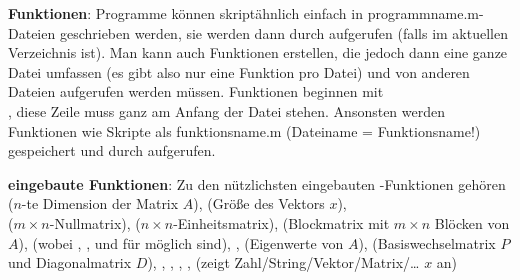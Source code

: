 \textbf{Funktionen}:
Programme können skriptähnlich einfach in programmname.m-Dateien geschrieben
werden, sie werden dann durch  aufgerufen (falls \matlab{} im
aktuellen Verzeichnis ist).
Man kann auch Funktionen erstellen, die jedoch dann eine ganze Datei umfassen
(es gibt also nur eine Funktion pro Datei) und von anderen Dateien aufgerufen
werden müssen.
Funktionen beginnen mit  \\
, diese Zeile muss ganz am Anfang
der Datei stehen.
Ansonsten werden Funktionen wie Skripte als funktionsname.m
(Dateiname = Funktionsname!) gespeichert und durch
 aufgerufen.

\textbf{eingebaute Funktionen}:
Zu den nützlichsten eingebauten \matlab{}-Funktionen gehören \\
 ($n$-te Dimension der Matrix $A$),
 (Größe des Vektors $x$), \\
 ($m \times n$-Nullmatrix),
 ($n \times n$-Einheitsmatrix),
 (Blockmatrix mit $m \times n$ Blöcken von $A$),
 (wobei , ,  und 
für  möglich sind),
,
 (Eigenwerte von $A$),
 (Basiswechselmatrix $P$ und Diagonalmatrix $D$),
,
, ,
,
 (zeigt Zahl/String/Vektor/Matrix/\ldots{} $x$ an)

\pagebreak
